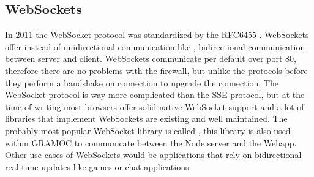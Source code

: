 \subsection{WebSockets}
In 2011 the WebSocket protocol was standardized by the RFC6455 \autocite{rfc6455}. WebSockets offer instead of unidirectional communication like , bidirectional communication between server and client. WebSockets communicate per default over port 80, therefore there are no problems with the firewall, but unlike the protocols before they perform a handshake on connection to upgrade the connection. The WebSocket protocol is way more complicated than the SSE protocol, but at the time of writing most browsers offer solid native WebSocket support and a lot of libraries that implement WebSockets are existing and well maintained. The probably most popular WebSocket library is called , this library is also used within GRAMOC to communicate between the Node server and the Webapp. Other use cases of WebSockets would be applications that rely on bidirectional real-time updates like games or chat applications.
